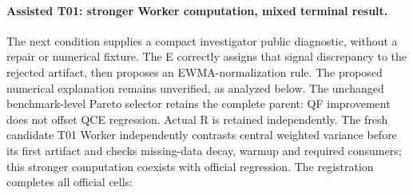 \paragraph{Assisted T01: stronger Worker computation, mixed terminal result.}
The next condition supplies a compact investigator public diagnostic, without
a repair or numerical fixture. The E correctly assigns that signal discrepancy
to the rejected artifact, then proposes an EWMA-normalization rule.
The proposed numerical explanation remains unverified, as analyzed below.
The unchanged benchmark-level Pareto selector retains the complete parent:
QF improvement does not offset QCE regression. Actual R is retained independently.
The fresh candidate T01 Worker independently contrasts central weighted
variance before its first artifact and checks missing-data decay, warmup and
required consumers; this stronger computation coexists with official regression.
The registration completes all \AssistedTOneTerminalCells{} official cells:
